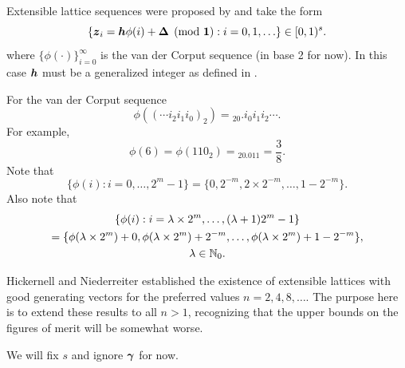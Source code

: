 \documentclass{amsart}
\begin{document}
Extensible lattice sequences were proposed by \cite{HicEtal00,Mai81a} and take the form
\begin{equation} \label{eq:extlat}
    \{\boldsymbol{z}_i = \boldsymbol{h}\phi(i)+ \boldsymbol{\Delta} \pmod{\boldsymbol{1}} : i=0,1, \ldots \} \in [0,1)^s.
\end{equation}
where $\{\phi(\cdot)\}_{i=0}^\infty$ is the van der Corput sequence (in base 2 for now).  In this case $\boldsymbol{h}$ must be a generalized integer as defined in \cite[Section 2]{HicNie03a}.

For the van der Corput sequence
\[
\phi((\cdots i_2 i_1 i_0)_2) = {}_20.i_0 i_1 i_2 \cdots.
\]
For example,
\[
\phi(6) = \phi(110_2) = {}_20.011 = \frac 38.
\]
Note that
\begin{equation} \label{eq:phipropone}
\{ \phi(i) : i = 0, \ldots, 2^m-1 \} = \{0, 2^{-m}, 2\times 2^{-m}, \ldots, 1 - 2^{-m} \}.
\end{equation}
Also note that
\begin{multline} \label{eq:phiproptwo}
\{ \phi(i) : i = \lambda \times 2^m , \ldots, (\lambda+1)2^m-1 \} \\
= \{\phi(\lambda \times 2^m) + 0, \phi(\lambda \times 2^m) + 2^{-m}, \ldots, \phi(\lambda \times 2^m) + 1 - 2^{-m} \} , \\
\lambda \in \mathbb{N}_{0}.
\end{multline}


Hickernell and Niederreiter \cite{HicNie03a} established the existence of extensible lattices with good generating vectors for the preferred values $n = 2, 4, 8, \ldots$.  The purpose here is to extend these results to all $n>1$, recognizing that the upper bounds on the figures of merit will be somewhat worse.

We will fix $s$ and ignore $\boldsymbol{\gamma}$ for now.
\end{document}
